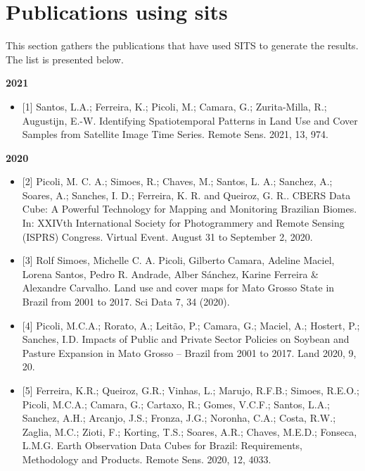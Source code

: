 \documentclass[a4paper,]{tufte-book}
\providecommand{\tightlist}{%
  \setlength{\itemsep}{0pt}\setlength{\parskip}{0pt}}
\begin{document}
\hypertarget{publications-using-sits}{%
\section*{\texorpdfstring{Publications using \textbf{sits}}{Publications using sits}}\label{publications-using-sits}}

This section gathers the publications that have used SITS to generate the results. The list is presented below.

\textbf{2021}

\begin{itemize}
\tightlist
\item
  {[}1{]} Santos, L.A.; Ferreira, K.; Picoli, M.; Camara, G.; Zurita-Milla, R.; Augustijn, E.-W. Identifying Spatiotemporal Patterns in Land Use and Cover Samples from Satellite Image Time Series. Remote Sens. 2021, 13, 974.
\end{itemize}

\textbf{2020}

\begin{itemize}
\item
  {[}2{]} Picoli, M. C. A.; Simoes, R.; Chaves, M.; Santos, L. A.; Sanchez, A.; Soares, A.; Sanches, I. D.; Ferreira, K. R. and Queiroz, G. R.. CBERS Data Cube: A Powerful Technology for Mapping and Monitoring Brazilian Biomes. In: XXIVth International Society for Photogrammery and Remote Sensing (ISPRS) Congress. Virtual Event. August 31 to September 2, 2020.
\item
  {[}3{]} Rolf Simoes, Michelle C. A. Picoli, Gilberto Camara, Adeline Maciel, Lorena Santos, Pedro R. Andrade, Alber Sánchez, Karine Ferreira \& Alexandre Carvalho. Land use and cover maps for Mato Grosso State in Brazil from 2001 to 2017. Sci Data 7, 34 (2020).
\item
  {[}4{]} Picoli, M.C.A.; Rorato, A.; Leitão, P.; Camara, G.; Maciel, A.; Hostert, P.; Sanches, I.D. Impacts of Public and Private Sector Policies on Soybean and Pasture Expansion in Mato Grosso -- Brazil from 2001 to 2017. Land 2020, 9, 20.
\item
  {[}5{]} Ferreira, K.R.; Queiroz, G.R.; Vinhas, L.; Marujo, R.F.B.; Simoes, R.E.O.; Picoli, M.C.A.; Camara, G.; Cartaxo, R.; Gomes, V.C.F.; Santos, L.A.; Sanchez, A.H.; Arcanjo, J.S.; Fronza, J.G.; Noronha, C.A.; Costa, R.W.; Zaglia, M.C.; Zioti, F.; Korting, T.S.; Soares, A.R.; Chaves, M.E.D.; Fonseca, L.M.G. Earth Observation Data Cubes for Brazil: Requirements, Methodology and Products. Remote Sens. 2020, 12, 4033.
\end{itemize}
\end{document}
